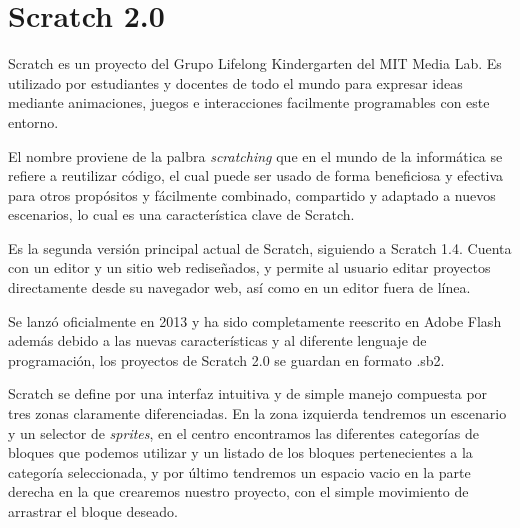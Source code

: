 \section{Scratch 2.0}
\label{sec:scratch}

Scratch es un proyecto del Grupo Lifelong Kindergarten del MIT Media Lab.
Es utilizado por estudiantes y docentes de todo el mundo para expresar ideas mediante animaciones, juegos e interacciones facilmente programables con este entorno.

El nombre proviene de la palbra \textit{scratching} que en el mundo de la informática se refiere a reutilizar código, el cual puede ser usado de forma beneficiosa y efectiva para otros propósitos y fácilmente combinado, compartido y adaptado a nuevos escenarios, lo cual es una característica clave de Scratch.

Es la segunda versión principal actual de Scratch, siguiendo a Scratch 1.4. Cuenta con un editor y un sitio web rediseñados, y permite al usuario editar proyectos directamente desde su navegador web, así como en un editor fuera de línea.

Se lanzó oficialmente en 2013 y ha sido completamente reescrito en Adobe Flash además debido a las nuevas características y al diferente lenguaje de programación, los proyectos de Scratch 2.0 se guardan en formato .sb2.

Scratch se define por una interfaz intuitiva y de simple manejo compuesta por tres zonas claramente diferenciadas. En la zona izquierda tendremos un escenario y un selector de \textit{sprites}, en el centro encontramos las diferentes categorías de bloques que podemos utilizar y un listado de los bloques pertenecientes a la categoría seleccionada, y por último tendremos un espacio vacio en la parte derecha en la que crearemos nuestro proyecto, con el simple movimiento de arrastrar el bloque deseado.


